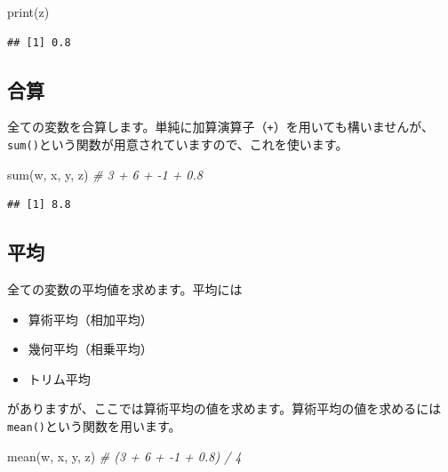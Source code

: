 \documentclass[
  12pt,
]{book}
\newenvironment{Shaded}{\begin{snugshade}}{\end{snugshade}}
\newcommand{\CommentTok}[1]{\textcolor[rgb]{0.56,0.35,0.01}{\textit{#1}}}
\newcommand{\FunctionTok}[1]{\textcolor[rgb]{0.00,0.00,0.00}{#1}}
\newcommand{\NormalTok}[1]{#1}
\providecommand{\tightlist}{%
  \setlength{\itemsep}{0pt}\setlength{\parskip}{0pt}}
\begin{document}
\begin{Shaded}
\begin{Highlighting}[]
\FunctionTok{print}\NormalTok{(z)}
\end{Highlighting}
\end{Shaded}

\begin{verbatim}
## [1] 0.8
\end{verbatim}

\hypertarget{ux5408ux7b97}{%
\subsection{合算}\label{ux5408ux7b97}}

全ての変数を合算します。単純に加算演算子（\texttt{+}）を用いても構いませんが、\texttt{sum()}という関数が用意されていますので、これを使います。

\begin{Shaded}
\begin{Highlighting}[]
\FunctionTok{sum}\NormalTok{(w, x, y, z)    }\CommentTok{\# 3 + 6 + {-}1 + 0.8}
\end{Highlighting}
\end{Shaded}

\begin{verbatim}
## [1] 8.8
\end{verbatim}

\hypertarget{ux5e73ux5747-1}{%
\subsection{平均}\label{ux5e73ux5747-1}}

全ての変数の平均値を求めます。平均には

\begin{itemize}
\tightlist
\item
  算術平均（相加平均）
\item
  幾何平均（相乗平均）
\item
  トリム平均
\end{itemize}

がありますが、ここでは算術平均の値を求めます。算術平均の値を求めるには\texttt{mean()}という関数を用います。

\begin{Shaded}
\begin{Highlighting}[]
\FunctionTok{mean}\NormalTok{(w, x, y, z)   }\CommentTok{\# (3 + 6 + {-}1 + 0.8) / 4}
\end{Highlighting}
\end{Shaded}
\end{document}
